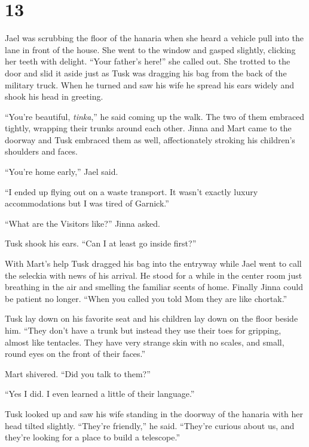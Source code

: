
\chapter{13}

Jael was scrubbing the floor of the hanaria when she heard a vehicle pull into the lane in front
of the house. She went to the window and gasped slightly, clicking her teeth with delight.
``Your father's here!'' she called out. She trotted to the door and slid it aside just as Tusk
was dragging his bag from the back of the military truck. When he turned and saw his wife he
spread his ears widely and shook his head in greeting.

``You're beautiful, \textit{tinka},'' he said coming up the walk. The two of them embraced
tightly, wrapping their trunks around each other. Jinna and Mart came to the doorway and Tusk
embraced them as well, affectionately stroking his children's shoulders and faces.

``You're home early,'' Jael said.

``I ended up flying out on a waste transport. It wasn't exactly luxury accommodations but I was
tired of Garnick.''

``What are the Visitors like?'' Jinna asked.

Tusk shook his ears. ``Can I at least go inside first?''

With Mart's help Tusk dragged his bag into the entryway while Jael went to call the seleckia
with news of his arrival. He stood for a while in the center room just breathing in the air and
smelling the familiar scents of home. Finally Jinna could be patient no longer. ``When you
called you told Mom they are like chortak.''

Tusk lay down on his favorite seat and his children lay down on the floor beside him. ``They
don't have a trunk but instead they use their toes for gripping, almost like tentacles. They
have very strange skin with no scales, and small, round eyes on the front of their faces.''

Mart shivered. ``Did you talk to them?''

``Yes I did. I even learned a little of their language.''

Tusk looked up and saw his wife standing in the doorway of the hanaria with her head tilted
slightly. ``They're friendly,'' he said. ``They're curious about us, and they're looking for a
place to build a telescope.''


